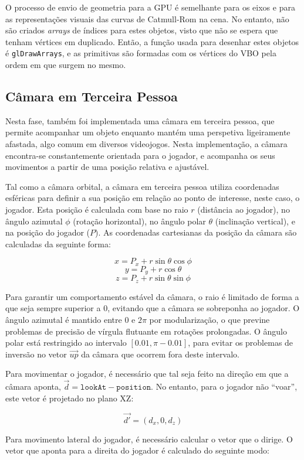 \documentclass[12pt, a4paper]{article}
\begin{document}
O processo de envio de geometria para a GPU é semelhante para os eixos e para as representações
visuais das curvas de Catmull-Rom na cena. No entanto, não são criados \emph{arrays} de índices para
estes objetos, visto que não se espera que tenham vértices em duplicado. Então, a função usada para
desenhar estes objetos é \texttt{glDrawArrays}, e as primitivas são formadas com os vértices do VBO
pela ordem em que surgem no mesmo.

\subsection{Câmara em Terceira Pessoa}

Nesta fase, também foi implementada uma câmara em terceira pessoa, que  permite acompanhar um objeto
enquanto mantém uma perspetiva ligeiramente afastada, algo comum em diversos videojogos. Nesta
implementação, a câmara encontra-se constantemente orientada para o jogador, e acompanha os seus
movimentos a partir de uma posição relativa e ajustável.

Tal como a câmara orbital, a câmara em terceira pessoa utiliza coordenadas esféricas para definir a
sua posição em relação ao ponto de interesse, neste caso, o jogador. Esta posição é calculada com
base no raio $r$ (distância ao jogador), no ângulo azimutal $\phi$ (rotação horizontal), no
ângulo polar $\theta$ (inclinação vertical), e na posição do jogador ($P$). As coordenadas
cartesianas da posição da câmara são calculadas da seguinte forma:

$$x = P_x + r \sin \theta \cos \phi$$
$$y = P_y + r \cos \theta$$
$$z = P_z + r \sin \theta \sin \phi$$

Para garantir um comportamento estável da câmara, o raio é limitado de forma a que seja sempre
superior a $0$, evitando que a câmara se sobreponha ao jogador. O ângulo azimutal é mantido entre
$0$ e $2\pi$ por modularização, o que previne problemas de precisão de vírgula flutuante em rotações
prolongadas. O ângulo polar está restringido ao intervalo $[0.01, \pi - 0.01]$, para evitar os
problemas de inversão no vetor $\vec{up}$ da câmara que ocorrem fora deste intervalo.

Para movimentar o jogador, é necessário que tal seja feito na direção em que a câmara aponta,
$\vec{d} = \texttt{lookAt} - \texttt{position}$. No entanto, para o jogador não ``voar'', este vetor
é projetado no plano XZ:

$$
\vec{d'} = (d_x, 0, d_z)
$$

Para movimento lateral do jogador, é necessário calcular o vetor que o dirige. O vetor que aponta
para a direita do jogador é calculado do seguinte modo:
\end{document}
